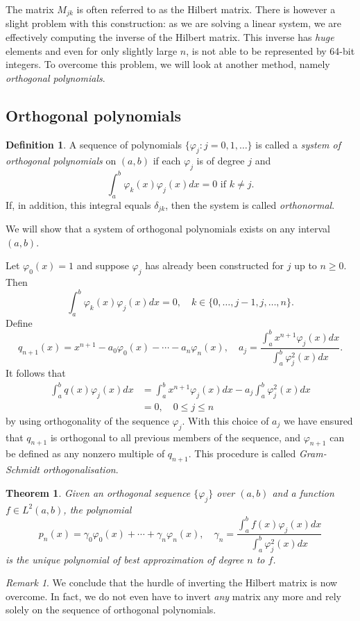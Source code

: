 \documentclass[11pt]{report}
\newtheorem{theorem}{Theorem}
\theoremstyle{definition}
\newtheorem{definition}{Definition}
\theoremstyle{remark}
\newtheorem*{remark}{Remark}
\renewcommand{\phi}{\varphi}
\begin{document}
The matrix $M_{jk}$ is often referred to as the Hilbert matrix. There is however a slight problem with this construction: as we are solving a linear system, we are effectively computing the inverse of the Hilbert matrix. This inverse has \emph{huge} elements and even for only slightly large $n$, is not able to be represented by 64-bit integers. To overcome this problem, we will look at another method, namely \emph{orthogonal polynomials}.

\subsection{Orthogonal polynomials}
\begin{definition}
  A sequence of polynomials $\{ \phi_j: j = 0, 1, \ldots \}$ is called a \emph{system of orthogonal polynomials} on $(a,b)$ if each $\phi_j$ is of degree $j$ and
  \[
    \int_a^b \phi_k(x) \phi_j(x) dx = 0 \text{ if } k \not= j.
  \]
  If, in addition, this integral equals $\delta_{jk}$, then the system is called \emph{orthonormal}.
\end{definition}

We will show that a system of orthogonal polynomials exists on any interval $(a,b)$.

Let $\phi_0(x) = 1$ and suppose $\phi_j$ has already been constructed for $j$ up to $n \geq 0$. Then
\[
  \int_a^b \phi_k(x) \phi_j(x) dx = 0, \quad k \in \{0,\ldots,j-1,j,\ldots,n\}.
\]
Define
\[
  q_{n+1}(x) = x^{n+1} - a_0 \phi_0(x) - \cdots - a_n \phi_n(x), \quad a_j = \frac{\int_a^b x^{n+1} \phi_j(x) dx}{\int_a^b \phi_j^2(x) dx}.
\]
It follows that
\begin{align*}
  \int_a^b q(x) \phi_j(x) dx &= \int_a^b x^{n+1} \phi_j(x) dx - a_j \int_a^b \phi_j^2 (x) dx \\
  &= 0, \quad 0 \leq j \leq n
\end{align*}
by using orthogonality of the sequence $\phi_j$. With this choice of $a_j$ we have ensured that $q_{n+1}$ is orthogonal to all previous members of the sequence, and $\phi_{n+1}$ can be defined as any nonzero multiple of $q_{n+1}$. This procedure is called \emph{Gram-Schmidt orthogonalisation}.
\begin{theorem}
  Given an orthogonal sequence $\{\phi_j\}$ over $(a,b)$ and a function $f \in L^2(a,b)$, the polynomial
  \[
    p_n(x) = \gamma_0 \phi_0(x) + \cdots + \gamma_n \phi_n(x), \quad \gamma_n = \frac{\int_a^b f(x) \phi_j(x) dx}{\int_a^b \phi_j^2 (x) dx}
  \]
  is the unique polynomial of best approximation of degree $n$ to $f$.
\end{theorem}
\begin{remark}
  We conclude that the hurdle of inverting the Hilbert matrix is now overcome. In fact, we do not even have to invert \emph{any} matrix any more and rely solely on the sequence of orthogonal polynomials.
\end{remark}
\end{document}
